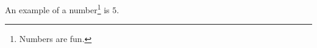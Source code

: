 \documentclass[a4paper,12pt]{article}
\begin{document}
 
An example of a number\footnote{Numbers are fun.} is $5$. 
\end{document}
